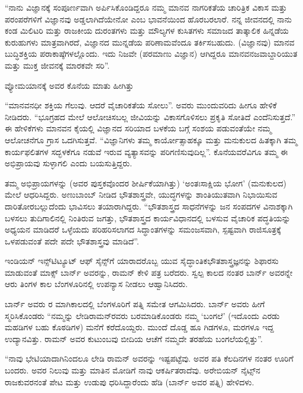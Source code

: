 \enginline{-}“ನಾನು ವಿಜ್ಞಾನಕ್ಕೆ ಸಂಪೂರ್ಣವಾಗಿ ಅರ್ಪಿಸಿಕೊಂಡಿದ್ದರೂ ನಮ್ಮ ಮಾನವ ನಾಗರಿಕತೆಯ ಚಾರಿತ್ರಿಕ ವಿಕಾಸ ಮತ್ತು ಪರಂಪರೆಗಳಿಗೆ ವಿಜ್ಞಾನವು ಅಡ್ಡಲಾಗಿದೆಯೇನೋ ಎಂಬ ಭಾವನೆಯಿಂದ ಹೊರಬರಲಾರೆ. ನನ್ನ ಜೀವನದಲ್ಲಿ ನಾನು ಕಂಡ ಮಿಲಿಟರಿ ಮತ್ತು ರಾಜಕೀಯ ದುರಂತಗಳು ಮತ್ತು ಮೌಲ್ಯಗಳ ಕುಸಿತಗಳು ಸಮಾಜದ ತಾತ್ಕಾಲಿಕ ಹಿನ್ನಡೆಯ ಕುರುಹುಗಳು ಮಾತ್ರವಾಗಿರದೆ, ವಿಜ್ಞಾನದ ಮುನ್ನಡೆಯ ಪರಿಣಾಮವೆಂದೂ ತರ್ಕಿಸಬಹುದು. (ವಿಜ್ಞಾನವು) ಮಾನವ ಬುದ್ಧಿಶಕ್ತಿಯ ಪರಾಕಾಷ್ಠೆಗಳಲ್ಲೊಂದು. ಇದು ನಿಜವೇ (ಪರಮಾಣು ವಿಜ್ಞಾನ) ಆಗಿದ್ದರೂ ಮಾನವನ\break ಜವಾಬ್ದಾರಿಯುತ ಮತ್ತು ಮುಕ್ತ ಜೀವನಕ್ಕೆ ಮಾರಕವೇ ಸರಿ”.

ವ್ಯೋಮಯಾನಕ್ಕೆ ಅವರ ಕೊನೆಯ ಮಾತು ಹೀಗಿತ್ತು\enginline{-}

“ಮಾನವನಧೀ ಶಕ್ತಿಯ ಗೆಲುವು. ಆದರೆ ವೈಚಾರಿಕತೆಯ ಸೋಲು”. ಅವರು ಮುಂದುವರಿದು ಹೀಗೂ ಹೇಳಿಕೆ ನೀಡಿದರು.\enginline{-} “ಭೂಗ್ರಹದ ಮೇಲೆ ಆಲೋಚಿಸಬಲ್ಲ ಜೀವಿಯನ್ನು ವಿಕಾಸಗೊಳಿಸಲು ಪ್ರಕೃತಿ ಸೋತಿದೆ ಎಂದೆನಿಸುತ್ತದೆ.” ಈ ಹೇಳಿಕೆಗಳು ಮಾನವನ ಕೈಯಲ್ಲಿ ವಿಜ್ಞಾನದ ಸರಿಯಾದ ಬಳಕೆಯ ಬಗ್ಗೆ ಸಂಶಯ ಪಡುವಂತೆಯೇ ನಮ್ಮ ಆಲೋಚನೆಗೂ ಗ್ರಾಸ ಒದಗಿಸುತ್ತವೆ. “ವಿಜ್ಞಾನಿಗಳು ತಮ್ಮ ಕಾರ್ಯೋತ್ಸಾಹಕ್ಕೂ ಮತ್ತು ಮನುಕುಲದ ಹಿತಕ್ಕಾಗಿ ತಮ್ಮ ಕಾರ್ಯಫಲಿತಗಳ ಸದ್ಭಳಕೆಗೂ ನಡುವೆ ಇರುವ ವ್ಯತ್ಯಾಸವನ್ನು ಪರಿಗಣಿಸುವುದಿಲ್ಲ”. ಕೊನೆಯವರೆವಿಗೂ ತಮ್ಮ ಈ ಅಭಿಪ್ರಾಯವು ಸುಳ್ಳಾಗಲಿ ಎಂದು ಬಯಸುತ್ತಿದ್ದರು.

ತಮ್ಮ ಅಭಿಪ್ರಾಯಗಳನ್ನು \textit{} (ಅವರ ಪುಸ್ತಕವೊಂದರ ಶೀರ್ಷಿಕೆ\-ಯಾಗಿತ್ತು)\enginline{-} ‘ಅಂತಃಸಾಕ್ಷಿಯ ಭೋಗ’ (ಮನುಕುಲದ) ಮೇಲೆ ಆಧರಿಸಿದ್ದರು. ಅಣುಬಾಂಬ್ ನೀಡಿದ ಭೌತಶಾಸ್ತ್ರವೇ, ಯುದ್ಧಗಳನ್ನು ಶಾಂತಿಯುತವಾಗಿ ನಿಭಾಯಿಸುವ ದಾರಿತೋರಬಲ್ಲುದೆಂದು ಭಾವಿಸಲು ತಯಾರಾಗಿದ್ದರು. “ಭೌತಶಾಸ್ತ್ರದ ಸಾಧನೆಗಳನ್ನು ಜನ ಸಂಪದಗಳ ವಿನಾಶಕ್ಕಾಗಿ ಬಳಸಲು ತುದಿಗಾಲಿನಲ್ಲಿ ನಿಂತಿರುವ ಜಗತ್ತು, ಭೌತಶಾಸ್ತ್ರದ ಕಾರ್ಯವಿಧಾನದಲ್ಲಿ ಬಳಸುವ ವೈಚಾರಿಕ ಪದ್ಧತಿಯನ್ನು ಅಧ್ಯಯನ ಮಾಡಿದರೆ ಒಳ್ಳೆಯದು ಪರಿಹರಿಸಲಾಗದ ಸಿದ್ಧಾಂತಗಳನ್ನು ಸಮಂಜಸವಾಗಿ, ಸ್ಪಷ್ಟವಾಗಿ ರಾಜಿಸೂತ್ರಕ್ಕೆ ಒಳಪಡುವಂತೆ ಪದೇ ಪದೇ ಭೌತಶಾಸ್ತ್ರವು ಮಾಡಿದೆ”.

ಇಂಡಿಯನ್ ಇನ್ಸ್‌ಟಿಟ್ಯೂಟ್ ಆಫ್ ಸೈನ್ಸ್‌ಗೆ ಯಾರಾದರೊಬ್ಬ ಯುವ ಸೈದ್ಧಾಂತಿಕ\break ಭೌತಶಾಸ್ತ್ರಜ್ಞನನ್ನು ಶಿಫಾರಸು ಮಾಡುವಂತೆ ಮಾಕ್ಸ್ ಬಾರ್ನ್ ಅವರನ್ನು, ರಾಮನ್ ಕೇಳಿ ಪತ್ರ ಬರೆದರು. ಸ್ವಲ್ಪ ಕಾಲದ ನಂತರ ಬಾರ್ನ್ ಅವರನ್ನೇ ಆರು ತಿಂಗಳ ಕಾಲ ಬೆಂಗಳೂರಿನಲ್ಲಿ ಉಪನ್ಯಾಸ ನೀಡಲು ಆಹ್ವಾನಿಸಿದರು.

ಬಾರ್ನ್ ಅವರು ರ ಮಾಗಿಕಾಲದಲ್ಲಿ ಬೆಂಗಳೂರಿಗೆ ಪತ್ನಿ ಸಮೇತ ಆಗಮಿಸಿದರು. ಬಾರ್ನ್ ಅವರು ಹೀಗೆ ಸ್ಮರಿಸಿಕೊಂಡರು\enginline{-} “ನಮ್ಮನ್ನು ಲೇಡಿರಾಮನ್‍ರವರು ಬರಮಾಡಿಕೊಂಡರು ನಮ್ಮ ‘ಬಂಗಲೆ’ \enginline{-}(ಇದೊಂದು ಎರಡು ಮಹಡಿಗಳ ಬಹು ಕೊಠಡಿಗಳ) ಮನೆಗೆ ಕರೆದೊಯ್ದರು. ಮುಂದೆ ದೊಡ್ಡ ಹೂ ಗಿಡಗಳೂ, ಮರಗಳೂ ಇದ್ದ ಉದ್ಯಾನವಿತ್ತು. ರಾಮನ್ ಅವರ ಕುಟುಂಬವು ಬೀದಿಯ ಆಚೆಗೆ ನಮ್ಮದೇ ತರಹೆಯ ಬಂಗಲೆಯಲ್ಲಿತ್ತು”.

“ನಾವು ಭೇಟಿಯಾದಾಗಿನಿಂದಲೂ ಲೇಡಿ ರಾಮನ್ ಅವರನ್ನು ಇಷ್ಟಪಟ್ಟೆವು. ಅವರ ಪತಿ ಕೆಲದಿನಗಳ ನಂತರ ಊರಿಗೆ ಬಂದರು. ಅವರ ನಿಲುವು ಮತ್ತು ಮಾತಿನ ಮೋಡಿಗೆ ನಾವು ಆಕರ್ಷಿತರಾದೆವು. ಅರೇಬಿಯನ್ ನೈಟ್ಸ್‌ನ ರಾಜಕುವರನಂತೆ ಪೇಟ ಮತ್ತು ಉಡುಪು ಧರಿಸಿದ್ದಾರೆಂದು ಹೆಡಿ (ಬಾರ್ನ್ ಅವರ ಪತ್ನಿ) ಹೇಳಿದಳು.

